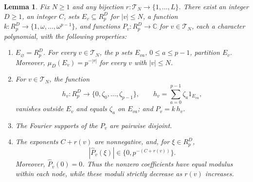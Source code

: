 \documentclass[10pt,a4paper]{amsart}
\newtheorem{lemma}{Lemma}
\newcommand{\R}{R}
\newcommand{\T}{\mathcal T}
\begin{document}
\begin{lemma}\label{lem:realize}
Fix \(N\geq1\) and any bijection \(r:\T_N\to\{1,\ldots,L\}\).
There exist an integer \(D\geq1\), an integer \(C\),
sets \(E_v\subseteq\R_p^D\) for \(|v|\leq N\), a function
\(k:\R_p^D\to\{1,\omega,\ldots,\omega^{p-1}\}\), and functions
\(P_v:\R_p^D\to\mathbb C\) for \(v\in\T_N\), each a character polynomial, with the following properties:
\begin{enumerate}
 \item \(E_\varnothing=\R_p^D\). For every \(v\in\T_N\), the \(p\) sets
       \(E_{va}\), \(0\leq a\leq p-1\), partition \(E_v\). Moreover,
       \(\mu_D(E_v)=p^{-|v|}\) for every \(v\) with \(|v|\leq N\).
 \item For \(v\in\T_N\), the function
       \[
        h_v:\R_p^D\to\{0,\zeta_0,\ldots,\zeta_{p-1}\},\qquad
        h_v=\sum_{a=0}^{p-1}\zeta_a1_{E_{va}},
       \]
       vanishes outside \(E_v\) and equals \(\zeta_a\) on \(E_{va}\);
       and \(P_v=k\,h_v\).
 \item The Fourier supports of the \(P_v\) are pairwise disjoint.
 \item The exponents \(C+r(v)\) are nonnegative, and, for
       \(\xi\in\R_p^D\),
       \[
        |\widehat P_v(\xi)|\in\{0,p^{-(C+r(v))}\}.
       \]
       Moreover, \(\widehat P_v(0)=0\).
       Thus the nonzero coefficients have equal modulus within each
       node, while these moduli strictly decrease as \(r(v)\) increases.
\end{enumerate}
\end{lemma}
\end{document}
